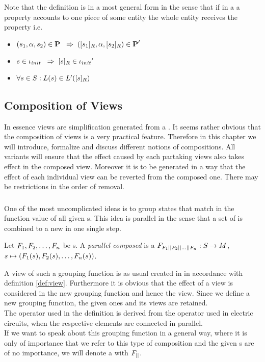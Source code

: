 \documentclass[preview]{standalone}
\begin{document}
Note that the definition is in a most general form in the sense that if in a \viewN a property accounts to one piece of some entity the whole entity receives the property i.e. 
\begin{itemize}	
	\item $({s}_1, {\alpha}, {s}_2) \in {\ensuremath{{\textbf{P}}}} {\hspace{3mm}\Rightarrow\hspace{2mm}} ({{[{s}_1]_{{R}}}}, {\alpha}, {{[{s}_2]_{{R}}}}) \in {\ensuremath{{\textbf{P}}}}'$
	\item ${s} \in {\ensuremath{{\iota_{init}}}} {\hspace{3mm}\Rightarrow\hspace{2mm}} {\ensuremath{{[{s}]_{{R}}}}} \in {\iota_{init}}'$
	\item $\forall {s} \in {S} : {L}({s}) \in {L}'({{[{s}]_{{R}}}})$
\end{itemize}

\subsection{Composition of Views}
In essence views are simplification generated from a \chosengraphtypeN. It seems rather obvious that the composition of views is a very practical feature. Therefore in this chapter we will introduce, formalize and discuss different notions of compositions. All variants will ensure that the effect caused by each partaking views also takes effect in the composed view. Moreover it is to be generated in a way that the effect of each individual view can be reverted from the composed one. There may be restrictions in the order of removal.

\subsubsection{\parllcompNCC}
One of the most uncomplicated ideas is to group states that match in the function value of all given \grpfctN s. This idea is parallel in the sense that a set of \grpfctN is combined to a new \grpfctN in one single step.
\begin{definition}
	Let ${F}_1, {F}_2, \dots, {F}_n$ be \grpfctN s. A \emph{parallel composed \grpfctN} is a \grpfctN ${F}_{{F}_1 {||} {F}_2 {||} \dots {||} {F}_n}: {S} \to {M}$, ${s} \mapsto ({F}_1({s}), {F}_2({s}), \dots, {F}_n({s}))$.
		
\end{definition}

A view of such a grouping function is as usual created in in accordance with definition \ref{def:view}. Furthermore it is obvious that the effect of a view is considered in the new grouping function and hence the view.
Since we define a new grouping function, the given ones and its views are retained. \\
The operator \pll used in the definition is derived from the operator used in electric circuits, when the respective elements are connected in parallel. \\
If we want to speak about this grouping function in a general way, where it is only of importance that we refer to this type of composition and the given \grpfctN s are of no importance, we will denote a \emph{\parllcompN \grpfctN} with ${F}_{{||}}$. \\
\end{document}
